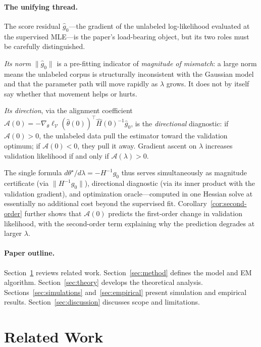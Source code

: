 \documentclass[11pt]{article}
\theoremstyle{definition}
\newcommand{\lam}{\lambda}
\newcommand{\calV}{\mathcal{V}}
\newcommand{\calA}{\mathcal{A}}
\begin{document}
\paragraph{The unifying thread.}
The score residual \(\hat g_0\)---the gradient of the unlabeled log-likelihood
evaluated at the supervised MLE---is the paper's load-bearing object,
but its two roles must be carefully distinguished.

\emph{Its norm} \(\|\hat g_0\|\) is a pre-fitting indicator of
\emph{magnitude of mismatch}: a large norm means the unlabeled corpus is
structurally inconsistent with the Gaussian model and that the parameter
path will move rapidly as \(\lam\) grows.
It does not by itself say whether that movement helps or hurts.

\emph{Its direction}, via the alignment coefficient
\(\calA(0) = -\nabla_\theta\ell_{\calV}(\hat\theta(0))^\top
\hat H(0)^{-1}\hat g_0\),
is the \emph{directional} diagnostic:
if \(\calA(0)>0\), the unlabeled data pull the estimator toward the
validation optimum; if \(\calA(0)<0\), they pull it away.
Gradient ascent on \(\lam\) increases validation likelihood if and only
if \(\calA(\lam)>0\).

The single formula \(d\theta^\star/d\lam = -H^{-1}g_0\) thus serves
simultaneously as magnitude certificate (via \(\|H^{-1}g_0\|\)),
directional diagnostic (via its inner product with the validation gradient),
and optimization oracle---computed in one Hessian solve at essentially no
additional cost beyond the supervised fit.
Corollary~\ref{cor:second-order} further shows that \(\calA(0)\) predicts
the first-order change in validation likelihood, with the second-order term
explaining why the prediction degrades at larger \(\lam\).

\paragraph{Paper outline.}
Section~\ref{sec:related} reviews related work.
Section~\ref{sec:method} defines the model and EM algorithm.
Section~\ref{sec:theory} develops the theoretical analysis.
Sections~\ref{sec:simulations} and~\ref{sec:empirical} present simulation
and empirical results.
Section~\ref{sec:discussion} discusses scope and limitations.


\section{Related Work}
\label{sec:related}
\end{document}
